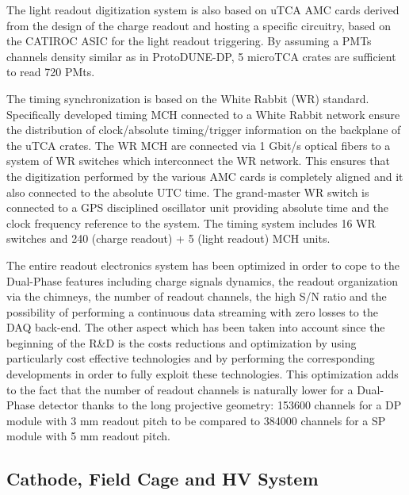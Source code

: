 The light readout digitization system is also based on uTCA AMC cards derived from the design of the charge readout and hosting a specific circuitry, based on the CATIROC ASIC for the light readout triggering. By assuming a PMTs channels density similar as in ProtoDUNE-DP, 5 microTCA crates are sufficient to read 720 PMts.

The timing synchronization is based on the White Rabbit (WR) standard. Specifically developed timing MCH connected to a White Rabbit network ensure the distribution of clock/absolute timing/trigger information on the backplane of the uTCA crates. The WR MCH are connected via 1 Gbit/s optical fibers to a system of WR switches which interconnect the WR network. This ensures that the digitization performed by the various AMC cards is completely aligned and it also connected to the absolute UTC time. The grand-master WR switch is connected to a GPS disciplined oscillator unit providing absolute time and the clock frequency reference to the system. The timing system includes 16 WR switches and 240 (charge readout) + 5 (light readout) MCH units.    

The entire readout electronics system has been optimized in order to cope to the Dual-Phase features including charge signals dynamics, the readout organization via the chimneys, the number of readout channels, the high S/N ratio and the possibility of performing a continuous data streaming with zero losses to the DAQ back-end. The other aspect which has been taken into account since the beginning of the R\&D is the costs reductions and optimization by using particularly cost effective technologies and by performing the corresponding developments in order to fully exploit these technologies.  This optimization adds to the fact that the number of readout channels is naturally lower for a Dual-Phase detector thanks to the long projective geometry: 153600 channels for a DP module with 3 mm readout pitch to be compared to 384000 channels for a SP module with 5 mm readout pitch.

\subsection{Cathode, Field Cage and HV System}
\label{v4:fddp-ov:cathode}

